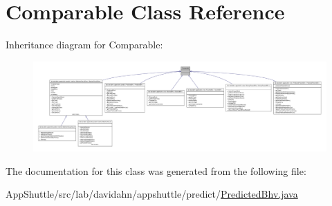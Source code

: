 \hypertarget{class_comparable}{\section{\-Comparable \-Class \-Reference}
\label{class_comparable}
}


\-Inheritance diagram for \-Comparable\-:
\nopagebreak
\begin{figure}[H]
\begin{center}
\leavevmode
\includegraphics[width=350pt]{class_comparable__inherit__graph}
\end{center}
\end{figure}


\-The documentation for this class was generated from the following file\-:\begin{DoxyCompactItemize}
\item 
\-App\-Shuttle/src/lab/davidahn/appshuttle/predict/\hyperlink{_predicted_bhv_8java}{\-Predicted\-Bhv.\-java}\end{DoxyCompactItemize}
